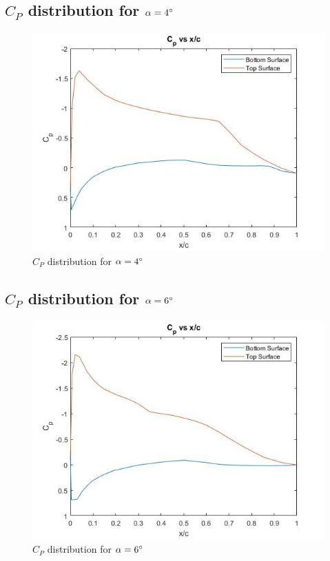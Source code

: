 \documentclass[12pt]{article}
\begin{document}
    \newpage
    \subsection{\(C_P\) distribution for \(\alpha = 4\degree\)}
    \begin{figure}[h]
        \includegraphics[width=16 cm]{4.jpg}
        \centering
        \caption{\(C_P\) distribution for \(\alpha = 4\degree\)}
    \end{figure}
    
        \newpage
    \subsection{\(C_P\) distribution for \(\alpha = 6\degree\)}
    \begin{figure}[h]
        \includegraphics[width=16 cm]{6.jpg}
        \centering
        \caption{\(C_P\) distribution for \(\alpha = 6\degree\)}
    \end{figure}
    
\end{document}
